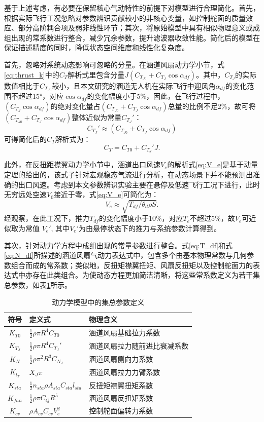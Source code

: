 基于上述考虑，有必要在保留核心气动特性的前提下对模型进行合理简化。首先，根据实际飞行工况忽略对参数辨识贡献较小的非核心变量，如控制舵面的质量效应、部分高阶耦合项及弱非线性环节；其次，将原始模型中具有相似物理意义或成组出现的常系数进行整合，减少冗余参数，提升滤波器收敛性能。简化后的模型在保证描述精度的同时，降低状态空间维度和线性化复杂度。

首先，忽略对系统动态影响可忽略的分量。在涵道风扇动力学小节，式\eqref{eq:thrust_k}中的$C_T$解析式里包含分量$J(C_{T_{J0}} + C_{T_J} \cos\alpha_{df})$。其中，$C_{T_J}$的实际数值相比于$C_{T_{J0}}$较小，且本文研究的涵道无人机在实际飞行中迎风角$\alpha _{df}$的变化范围不超过15°，对应$\cos\alpha_{df}$的变化幅度小于5\%，因此，在飞行过程中，$(C_{T_J} \cos\alpha_{df})$的绝对变化量占$(C_{T_{J0}} + C_{T_J} \cos\alpha_{df})$总量的比例不足2\%，故可将$(C_{T_{J0}} + C_{T_J} \cos\alpha_{df})$整体近似为常量$C_{T_J}'$：
\begin{equation}
    C_{T_J}' \approx (C_{T_{J0}} + C_{T_J} \cos\alpha_{df})
\end{equation}
可得简化后的$C_T$解析式为：
\begin{equation}
    C_T = C_{T0} + C_{T_J}' J.
    \label{eq:C_T}
\end{equation}

此外，在反扭距襟翼动力学小节中，涵道出口风速$V_e$的解析式\eqref{eq:V_e}是基于动量定理的给出的，该式子针对宏观稳态气流进行分析，在动态场景下并不能预测出准确的出口风速。考虑到本文参数辨识实验主要在悬停及低速飞行工况下进行，此时无穷远处空速$V_0$接近于零，式\eqref{eq:V_e}可简化为：
\begin{equation}
    V_e \approx \sqrt{T_{df}/\theta _d \rho S}.
\end{equation}
经观察，在此工况下，推力$T_{df}$的变化幅度小于10\%，对应$T_e$不超过5\%，故$V_e$可近似取为常值 $V_e'$, 其中$V_e'$为由悬停状态下的推力与系统参数计算得到。

其次，针对动力学方程中成组出现的常量参数进行整合。式\eqref{eq:T_df}和式\eqref{eq:N_df}所描述的涵道风扇气动力表达式中，包含多个由基本物理常数与几何参数组合而成的常系数；类似地，反扭矩襟翼扭矩、风扇反扭矩以及控制舵面力的表达式中亦存在此类组合。为使动态方程更加简洁清晰，将这些常系数定义为若干集总参数，如表\ref{tab:lumped_parameters}所示。

\begin{table}[htbp]
\centering
\caption{\label{tab:lumped_parameters}动力学模型中的集总参数定义}
\begin{tabular}{cll}
\toprule
符号 & 定义式 & 物理含义 \tabularnewline
\midrule
$K_{T0}$ & $ \frac{1}{2}\rho \pi R^4 C_{T0}$ \hfill & 涵道风扇基础拉力系数 \tabularnewline
$K_{T_J}$ & $ \frac{1}{2}\rho \pi R^4 C_{T_J}'$ \hfill & 涵道风扇拉力随前进比衰减系数 \tabularnewline
$K_{N}$ & $ \frac{1}{2}\rho \pi^2 R^3 C_{N_J}$ \hfill & 涵道风扇侧向力系数 \tabularnewline
$K_{l_T}$ & $ X_J \pi$ \hfill & 涵道风扇拉力力臂系数 \tabularnewline
$K_{sta}$ & $ \frac{1}{2} n_{sta} \rho A_{sta} C_{sta} l_{sta}$ \hfill & 反扭矩襟翼扭矩系数 \tabularnewline
$K_{fan}$ & $ \frac{1}{2}\rho \pi C_Q R^5$ \hfill & 涵道风扇反扭矩系数 \tabularnewline
$K_{cv}$ & $ \rho A_{cv} C_{cv} V_e^2$ \hfill & 控制舵面偏转力系数 \tabularnewline
\bottomrule
\end{tabular}
\end{table}

